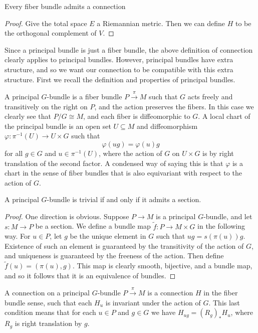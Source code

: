 \begin{prop}
Every fiber bundle admits a connection
\end{prop}
\begin{proof}
Give the total space $E$ a Riemannian metric. Then we can define $H$ to be the orthogonal complement of $V$.
\end{proof}

Since a principal bundle is just a fiber bundle, the above definition of connection clearly applies to principal bundles. However, principal bundles have extra structure, and so we want our connection to be compatible with this extra structure. First we recall the definition and properties of principal bundles.

A principal $G$-bundle is a fiber bundle $P \stackrel{\pi}{\rightarrow} M$ such that $G$ acts freely and transitively on the right on $P$, and the action preserves the fibers. In this case we clearly see that $P/G \cong M$, and each fiber is diffeomorphic to $G$. A local chart of the principal bundle is an open set $U \subseteq M$ and diffeomorphism $\varphi : \pi^{-1}(U) \rightarrow U \times G$ such that
\[ \varphi (ug) = \varphi(u)g \]
for all $g \in G$ and $u \in \pi^{-1}(U)$, where the action of $G$ on $U \times G$ is by right translation of the second factor. A condensed way of saying this is that $\varphi$ is a chart in the sense of fiber bundles that is also equivariant with respect to the action of $G$.

\begin{prop}
A principal $G$-bundle is trivial if and only if it admits a section.
\end{prop}
\begin{proof}
One direction is obvious. Suppose $P \rightarrow M$ is a principal $G$-bundle, and let $s : M \rightarrow P$ be a section. We define a bundle map $\tilde{f} : P \rightarrow M \times G$ in the following way. For $u \in P$, let $g$ be the unique element in $G$ such that $ug = s(\pi(u))g$. Existence of such an element is guaranteed by the transitivity of the action of $G$, and uniqueness is guaranteed by the freeness of the action. Then define $\tilde{f}(u) = (\pi(u),g)$. This map is clearly smooth, bijective, and a bundle map, and so it follows that it is an equivalence of bundles.
\end{proof}

A connection on a principal $G$-bundle $P \stackrel{\pi}{\rightarrow} M$ is a connection $H$ in the fiber bundle sense, such that each $H_u$ is invariant under the action of $G$. This last condition means that for each $u \in P$ and $g \in G$ we have $H_{ug} = (R_g)_* H_u$, where $R_g$ is right translation by $g$.

